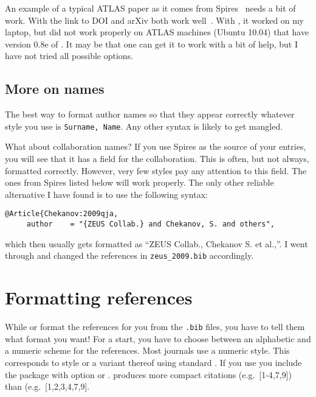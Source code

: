 An example of a typical ATLAS paper as it comes from
Spires~\cite{Aad:2010ey-inspire} needs a bit of work.  With  the link to DOI and arXiv both work well~\cite{Aad:2010ey-final}.
With , it worked on my laptop, but did not work properly
on ATLAS machines (Ubuntu 10.04) that have version 0.8e of .
It may be that one can get it to work with a bit of help, but I have
not tried all possible options.



\subsection{More on names}
\label{sec:ref:names}

The best way to format author names so that they appear correctly
whatever \BibTeX{} style you use is \texttt{Surname, Name}. Any other
syntax is likely to get mangled.

What about collaboration names? If you use Spires as the source of
your \BibTeX{} entries, you will see that it has a field for the
collaboration. This is often, but not always, formatted
correctly. However, very few \BibTeX{} styles pay any attention to
this field. The ones from Spires listed below will work properly. The
only other reliable alternative I have found is to use the following
syntax:
\begin{verbatim}
@Article{Chekanov:2009qja,
     author    = "{ZEUS Collab.} and Chekanov, S. and others",
\end{verbatim}
which then usually gets formatted as \enquote{ZEUS Collab., Chekanov S. et
al.,}.
I went through and changed the references in \texttt{zeus\_2009.bib}
accordingly.


\section{Formatting references}
\label{sec:ref:format}

While \BibTeX{} or  format the references for you
from the \texttt{.bib} files, you have to tell them what format you
want!  For a start, you have to choose between an alphabetic and a
numeric scheme for the references. Most journals use a numeric
style. This corresponds to style  or a variant thereof
using standard \BibTeX.  If you use  you include the
package with option  or
.  produces more compact
citations (e.g.\ [1-4,7,9]) than  (e.g.\
[1,2,3,4,7,9].

